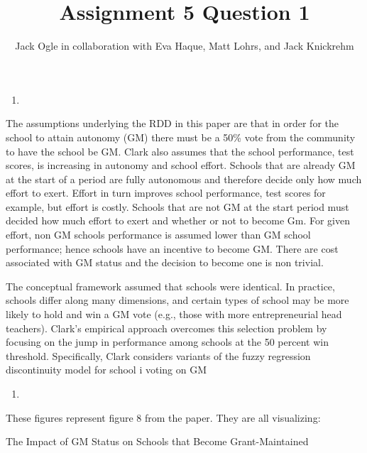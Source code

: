 \documentclass[
  12pt,
  landscape]{article}
\title{Assignment 5 Question 1}
\author{Jack Ogle in collaboration with Eva Haque, Matt Lohrs, and Jack
Knickrehm}
\date{}
\begin{document}
\maketitle

\begin{enumerate}
\def\labelenumi{(\alph{enumi})}
\item
\end{enumerate}

The assumptions underlying the RDD in this paper are that in order for
the school to attain autonomy (GM) there must be a 50\% vote from the
community to have the school be GM. Clark also assumes that the school
performance, test scores, is increasing in autonomy and school effort.
Schools that are already GM at the start of a period are fully
autonomous and therefore decide only how much effort to exert. Effort in
turn improves school performance, test scores for example, but effort is
costly. Schools that are not GM at the start period must decided how
much effort to exert and whether or not to become Gm. For given effort,
non GM schools performance is assumed lower than GM school performance;
hence schools have an incentive to become GM. There are cost associated
with GM status and the decision to become one is non trivial.

The conceptual framework assumed that schools were identical. In
practice, schools differ along many dimensions, and certain types of
school may be more likely to hold and win a GM vote (e.g., those with
more entrepreneurial head teachers). Clark's empirical approach
overcomes this selection problem by focusing on the jump in performance
among schools at the 50 percent win threshold. Specifically, Clark
considers variants of the fuzzy regression discontinuity model for
school i voting on GM

\begin{enumerate}
\def\labelenumi{(\alph{enumi})}
\setcounter{enumi}{1}
\item
\end{enumerate}

These figures represent figure 8 from the paper. They are all
visualizing:

The Impact of GM Status on Schools that Become Grant-Maintained
\end{document}
